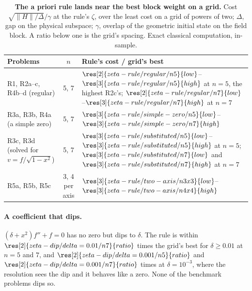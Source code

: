 \begin{table}[htbp]
    \centering
    \caption[The a priori block weight against a grid search]{\textbf{The a priori rule lands near the best block weight on a grid.} Cost $\sqrt{\|H\|/\Delta}/\gamma$ at the rule's $\zeta$, over the least cost on a grid of powers of two; $\Delta$, gap on the physical subspace; $\gamma$, overlap of the geometric initial state on the field block. A ratio below one is the grid's spacing. Exact classical computation, in-sample.}
    \label{tab:app-zeta-rule}
    \small
    \begin{tabular}{@{}l c l@{}}
        \toprule
        Problems & $n$ & Rule's cost / grid's best \\
        \midrule
        R1, R2a--c, R4b--d (regular) & 5, 7 & $\res[2]{zeta-rule/regular/n5}{low}$--$\res[3]{zeta-rule/regular/n5}{high}$ at $n=5$, the highest R2c's; $\res[2]{zeta-rule/regular/n7}{low}$--$\res[3]{zeta-rule/regular/n7}{high}$ at $n=7$ \\
        R3a, R3b, R4a (a simple zero) & 5, 7 & $\res[3]{zeta-rule/simple-zero/n5}{low}$--$\res[3]{zeta-rule/simple-zero/n7}{high}$ \\
        R3c, R3d (solved for $v=f/\sqrt{1-x^2}$) & 5, 7 & $\res[3]{zeta-rule/substituted/n5}{low}$--$\res[3]{zeta-rule/substituted/n5}{high}$ at $n=5$; $\res[3]{zeta-rule/substituted/n7}{low}$ and $\res[3]{zeta-rule/substituted/n7}{high}$ at $n=7$ \\
        R5a, R5b, R5c & 3, 4 per axis & $\res[3]{zeta-rule/two-axis/n3x3}{low}$--$\res[3]{zeta-rule/two-axis/n4x4}{high}$ \\
        \bottomrule
    \end{tabular}
\end{table}

\paragraph{A coefficient that dips.} $(\delta+x^2)f''+f=0$ has no zero but dips to $\delta$. The rule is within $\res[2]{zeta-dip/delta=0.01/n7}{ratio}$ times the grid's best for $\delta\ge0.01$ at $n=5$ and $7$, and $\res[2]{zeta-dip/delta=0.001/n5}{ratio}$ and $\res[2]{zeta-dip/delta=0.001/n7}{ratio}$ times at $\delta=10^{-3}$, where the resolution sees the dip and it behaves like a zero. None of the benchmark problems dips so.


